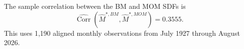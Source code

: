 The sample correlation between the BM and MOM SDFs is
\[
  \widehat{\operatorname{Corr}}\!\left(\hat M^{*,BM},\hat M^{*,MOM}\right) = 0.3555.
\]
This uses 1,190 aligned monthly observations from July 1927 through August 2026.
